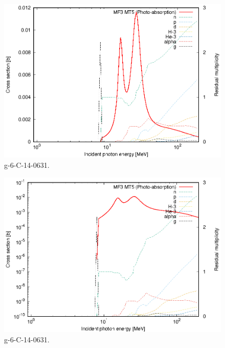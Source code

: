 \begin{figure}
 \includegraphics[width=\linewidth]{eps/g_6-C-14_0631.eps}
  \caption{g-6-C-14-0631.}
\end{figure}
\begin{figure}
 \includegraphics[width=\linewidth]{eps-log/g_6-C-14_0631.eps}
 \caption{g-6-C-14-0631.}
\end{figure}
\newpage \clearpage

